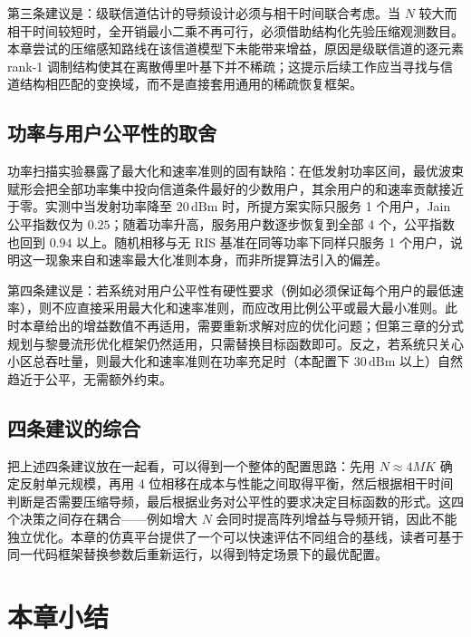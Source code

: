 第三条建议是：级联信道估计的导频设计必须与相干时间联合考虑。当 $N$ 较大而相干时间较短时，全开销最小二乘不再可行，必须借助结构化先验压缩观测数目。本章尝试的压缩感知路线在该信道模型下未能带来增益，原因是级联信道的逐元素 rank-1 调制结构使其在离散傅里叶基下并不稀疏；这提示后续工作应当寻找与信道结构相匹配的变换域，而不是直接套用通用的稀疏恢复框架。

\subsection{功率与用户公平性的取舍}
\label{sec:guidance_fairness}

功率扫描实验暴露了最大化和速率准则的固有缺陷：在低发射功率区间，最优波束赋形会把全部功率集中投向信道条件最好的少数用户，其余用户的和速率贡献接近于零。实测中当发射功率降至 $20\,\mathrm{dBm}$ 时，所提方案实际只服务 1 个用户，Jain 公平指数仅为 $0.25$；随着功率升高，服务用户数逐步恢复到全部 4 个，公平指数也回到 $0.94$ 以上。随机相移与无 RIS 基准在同等功率下同样只服务 1 个用户，说明这一现象来自和速率最大化准则本身，而非所提算法引入的偏差。

第四条建议是：若系统对用户公平性有硬性要求（例如必须保证每个用户的最低速率），则不应直接采用最大化和速率准则，而应改用比例公平或最大最小准则。此时本章给出的增益数值不再适用，需要重新求解对应的优化问题；但第三章的分式规划与黎曼流形优化框架仍然适用，只需替换目标函数即可。反之，若系统只关心小区总吞吐量，则最大化和速率准则在功率充足时（本配置下 $30\,\mathrm{dBm}$ 以上）自然趋近于公平，无需额外约束。

\subsection{四条建议的综合}
\label{sec:guidance_summary}

把上述四条建议放在一起看，可以得到一个整体的配置思路：先用 $N \approx 4MK$ 确定反射单元规模，再用 4 位相移在成本与性能之间取得平衡，然后根据相干时间判断是否需要压缩导频，最后根据业务对公平性的要求决定目标函数的形式。这四个决策之间存在耦合——例如增大 $N$ 会同时提高阵列增益与导频开销，因此不能独立优化。本章的仿真平台提供了一个可以快速评估不同组合的基线，读者可基于同一代码框架替换参数后重新运行，以得到特定场景下的最优配置。

\section{本章小结}
\label{sec:exp_summary}


